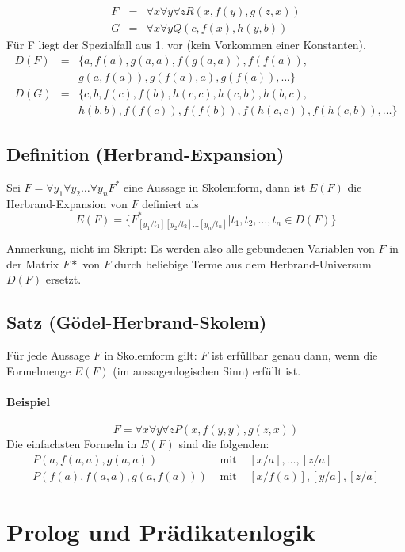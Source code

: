 \documentclass[a4paper]{scrartcl}
\begin{document}
\begin{eqnarray*}
	F & = &\forall x\forall y\forall zR(x,f(y),g(z,x)) \\
	G & = & \forall x\forall yQ(c,f(x),h(y,b))
\end{eqnarray*}
Für F liegt der Spezialfall aus 1. vor (kein Vorkommen einer Konstanten).
\begin{eqnarray*}
D(F) & = & \{a,f(a),g(a,a),f(g(a,a)),f(f(a)),\\
& & g(a,f(a)),g(f(a),a),g(f(a)),\ldots\}\\
D(G) & = & \{c,b,f(c),f(b),h(c,c),h(c,b),h(b,c),\\
& & h(b,b),f(f(c)),f(f(b)),f(h(c,c)),f(h(c,b)),\ldots\}
\end{eqnarray*}


\subsection{Definition (Herbrand-Expansion)}
 Sei $F=\forall y_1 \forall y_2 \ldots \forall y_n F^*$ eine Aussage in Skolemform,
dann ist $E(F)$ die Herbrand-Expansion von $F$ definiert als
$$E(F)=\{F^*_{[y_1/t_1][y_2/t_2]\ldots[y_n/t_n]} | t_1,t_2, \ldots, t_n \in D(F) \}$$

Anmerkung, nicht im Skript: Es werden also alle gebundenen Variablen von $F$ in der Matrix $F*$ von $F$ durch beliebige Terme aus dem Herbrand-Universum $D(F)$ ersetzt.

\subsection{Satz (Gödel-Herbrand-Skolem)}
Für jede Aussage $F$ in Skolemform gilt:
$F$ ist erfüllbar genau dann, wenn die Formelmenge $E(F)$ (im aussagenlogischen Sinn) erfüllt ist.

\paragraph{Beispiel}
$$F=\forall x \forall y \forall z P(x,f(y,y), g(z,x))$$
Die einfachsten Formeln in $E(F)$ sind die folgenden:
\begin{eqnarray*}
	P(a,f(a,a), g(a,a)) & \text{ mit } & [x/a], \ldots, [z/a]\\
	P(f(a), f(a,a), g(a,f(a)))& \text{ mit } &[x/f(a)], [y/a], [z/a]
\end{eqnarray*}

\section{Prolog und Prädikatenlogik}
\end{document}
